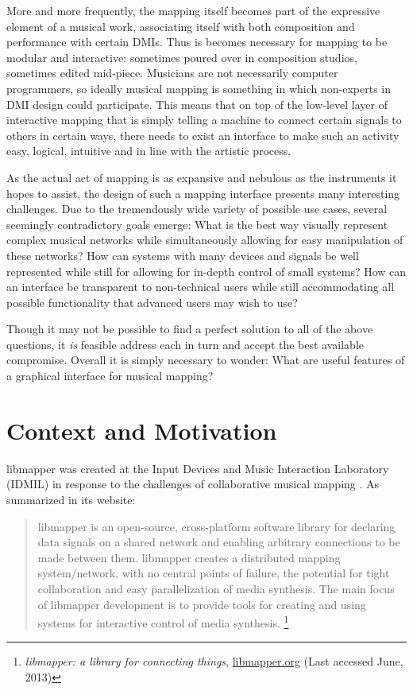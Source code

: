 More and more frequently, the mapping itself becomes part of the expressive element of a musical work, %
associating itself with both composition and performance with certain DMIs. Thus is becomes necessary for mapping to be modular and interactive: sometimes poured over in composition studios, sometimes edited mid-piece. Musicians are not necessarily computer programmers, so ideally musical mapping is something in which non-experts in DMI design could participate. This means that on top of the low-level layer of interactive mapping that is simply telling a machine to connect certain signals to others in certain ways, there needs to exist an interface to make such an activity easy, logical, intuitive and in line with the artistic process.

As the actual act of mapping is as expansive and nebulous as the instruments it hopes to assist, the design of such a mapping interface presents many interesting challenges. Due to the tremendously wide variety of possible use cases, several seemingly contradictory goals emerge: What is the best way visually represent complex musical networks while simultaneously allowing for easy manipulation of these networks? How can systems with many devices and signals be well represented while still for allowing for in-depth control of small systems? How can an interface be transparent to non-technical users while still accommodating all possible functionality that advanced users may wish to use? 

Though it may not be possible to find a perfect solution to all of the above questions, it \emph{is} feasible address each in turn and accept the best available compromise. Overall it is simply necessary to wonder: What are useful features of a graphical interface for musical mapping?

\section{Context and Motivation}

libmapper was created at the Input Devices and Music Interaction Laboratory (IDMIL) in response to the challenges of collaborative musical mapping . As summarized in its website:

\begin{quote} 
libmapper is an open-source, cross-platform software library for declaring data signals on a shared network and enabling arbitrary connections to be made between them. libmapper creates a distributed mapping system/network, with no central points of failure, the potential for tight collaboration and easy parallelization of media synthesis. The main focus of libmapper development is to provide tools for creating and using systems for interactive control of media synthesis.
\footnote{\emph{libmapper: a library for connecting things}, \url{libmapper.org} (Last accessed June, 2013)}
\end{quote}

